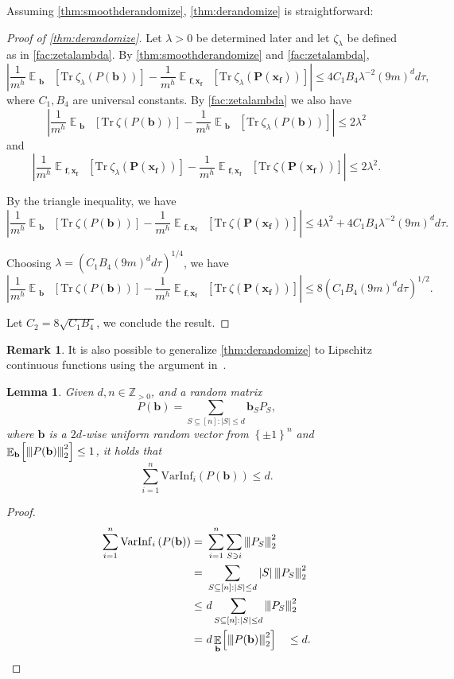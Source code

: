 \documentclass[11pt]{article}
\theoremstyle{plain}
\newtheorem{lemma}[theorem]{Lemma}
\theoremstyle{definition}
\newtheorem{remark}[theorem]{Remark}
\newcommand {\minusspace} {\: \! \!}
\newcommand {\Fn} [2] {\ensuremath{ #1 \minusspace \Br{ #2 } }}
\newcommand {\set} [1] {\ensuremath{ \left\lbrace #1 \right\rbrace }}
\newcommand {\br} [1] {\ensuremath{ \left( #1 \right) }}
\newcommand {\Br} [1] {\ensuremath{ \left[ #1 \right] }}
\newcommand {\ab} [1] {\ensuremath{ \left| #1 \right| }}
\DeclareMathOperator*{\bigE}{\mathbb{E}}
\newcommand {\expec} [2] {\Fn{\bigE_{\substack{#1}}}{#2}}
\newcommand{\nnorm}[1]{{\left\vert\kern-0.25ex\left\vert\kern-0.25ex\left\vert #1
		\right\vert\kern-0.25ex\right\vert\kern-0.25ex\right\vert}}
\newcommand {\Tr} {\ensuremath{ \mathrm{Tr} }}
\newcommand{\posint}{{\mathbb Z}_{>0}}
\newcommand{\randP}{\ensuremath{\mathbf{P}}}
\newcommand{\randb}{\ensuremath{\mathbf{b}}}
\newcommand{\randx}{\ensuremath{\mathbf{x}}}
\newcommand{\randf}{\ensuremath{\mathbf{f}}}
\newcommand{\varinfi}[1]{\ensuremath{\mathrm{VarInf}_i}\br{#1}}
\newcommand{\1}{\mathbb{1}} %
\begin{document}
Assuming \cref{thm:smoothderandomize}, \cref{thm:derandomize} is straightforward: 

\begin{proof}[Proof of \cref{thm:derandomize}]
Let $\lambda>0$ be determined later and let $\zeta_\lambda$ be defined as in \cref{fac:zetalambda}. By \cref{thm:smoothderandomize} and \cref{fac:zetalambda},
\[\ab{\frac{1}{m^h}\expec{\randb}{\Tr~\zeta_\lambda\br{P(\randb)}}-\frac{1}{m^h}\expec{\randf,\randx_\randf}{\Tr~\zeta_\lambda\br{\randP(\randx_\randf)}}}\leq 4C_1B_4\lambda^{-2}(9m)^dd\tau,\]
where $C_1,B_4$ are universal constants. By \cref{fac:zetalambda} we also have
\[\ab{\frac{1}{m^h}\expec{\randb}{\Tr~\zeta\br{P(\randb)}}-\frac{1}{m^h}\expec{\randb}{\Tr~\zeta_\lambda\br{P(\randb)}}}\leq 2\lambda^2\]
and
\[\ab{\frac{1}{m^h}\expec{\randf,\randx_\randf}{\Tr~\zeta_\lambda\br{\randP(\randx_\randf)}}-\frac{1}{m^h}\expec{\randf,\randx_\randf}{\Tr~\zeta\br{\randP(\randx_\randf)}}}\leq 2\lambda^2.\]

By the triangle inequality, we have
\[\ab{\frac{1}{m^h}\expec{\randb}{\Tr~\zeta\br{P(\randb)}}-\frac{1}{m^h}\expec{\randf,\randx_\randf}{\Tr~\zeta\br{\randP(\randx_\randf)}}}\leq4\lambda^2+4C_1B_4\lambda^{-2}(9m)^dd\tau.\]

Choosing $\lambda=\br{C_1B_4(9m)^dd\tau}^{1/4}$, we have
\[\ab{\frac{1}{m^h}\expec{\randb}{\Tr~\zeta\br{P(\randb)}}-\frac{1}{m^h}\expec{\randf,\randx_\randf}{\Tr~\zeta\br{\randP(\randx_\randf)}}}\leq8\br{C_1B_4(9m)^dd\tau}^{1/2}.\]

Let $C_2=8\sqrt{C_1B_4}$, we conclude the result.
\end{proof}

\begin{remark}
It is also possible to generalize \cref{thm:derandomize} to Lipschitz continuous functions using the argument in~\cite[Lemma 3.5]{isaksson2012maximally}.
\end{remark}

\begin{lemma}\label{lem:simpletotalinf}
Given $d,n\in\posint$, and a random matrix
\[P(\randb)=\sum_{S\subseteq[n]:\ab{S}\leq d}\randb_SP_S,\]
where $\randb$ is a $2d$-wise uniform random vector from $\set{\pm 1}^n$ and $\expec{\randb}{\nnorm{P(\randb)}_2^2}\leq1$, it holds that  
\[\sum_{i=1}^n\varinfi{P(\randb)}\leq d.\]
\end{lemma}

\begin{proof}
    \begin{align*} \sum_{i=1}^n\varinfi{P(\randb)}=~&\sum_{i=1}^n\sum_{S\ni i}\nnorm{P_S}_2^2\\
    =~&\sum_{S\subseteq[n]:\ab{S}\leq d}\ab{S}\nnorm{P_S}_2^2\\
    \leq~&d\sum_{S\subseteq[n]:\ab{S}\leq d}\nnorm{P_S}_2^2\\
    =~&d\expec{\randb}{\nnorm{P(\randb)}_2^2}\quad\leq d.
    \end{align*} 
\end{proof}
\end{document}

